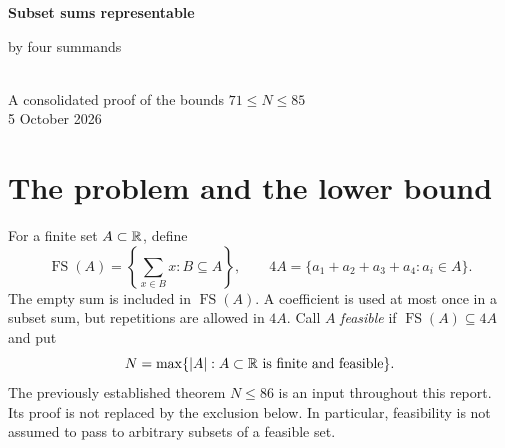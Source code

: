 \documentclass[11pt,letterpaper]{article}
\newcommand{\FS}{\operatorname{FS}}
\newcommand{\card}[1]{\lvert#1\rvert}
\theoremstyle{definition}\newtheorem{definition}[theorem]{Definition}
\begin{document}
\begin{center}
{\LARGE\bfseries Subset sums representable\par by four summands}\\[6pt]
{\large A consolidated proof of the bounds $71\le N\le85$}\\[5pt]
5 October 2026
\end{center}
\begin{abstract}
Let $N$ be the largest cardinality of a finite real set whose every subset sum is a sum of four of its elements, with repetition allowed in the four-term sum. We give an explicit $71$-element construction and organize the exclusion of cardinality $86$ into one coherent argument, obtaining $71\le N\le85$ from the previously established bound $N\le86$. The common covering budget, source estimates and loss-counting principles are stated once. The remaining cases are divided by their actual hole counts and their numbers of empty covering units. Each case is reduced to explicit endpoint, overlap or scalar contradictions. The prior upper bound, structural theorem and stated general and finite-backed additive-combinatorial results are retained inputs; this report does not claim a proof from first principles of those inputs. The companion program checks the explicitly identified finite assertions using exact arithmetic. The main text gives the common argument and its verification boundary; the longer complete stratum proofs are collected in labeled appendices. The exact value of $N$ remains unknown.
\end{abstract}
\setcounter{tocdepth}{2}{\setlength{\parskip}{0pt}\tableofcontents}
\clearpage
\section{The problem and the lower bound}\label{sec:problem}
For a finite set $A\subset\mathbb R$, define
\[
\FS(A)=\left\{\sum_{x\in B}x:B\subseteq A\right\},\qquad
4A=\{a_1+a_2+a_3+a_4:a_i\in A\}.
\]
The empty sum is included in $\FS(A)$. A coefficient is used at most once in a subset sum, but repetitions are allowed in $4A$. Call $A$ \emph{feasible} if $\FS(A)\subseteq4A$ and put
\[
N=\max\{\card A:A\subset\R\text{ is finite and feasible}\}.
\]
The previously established theorem $N\le86$ is an input throughout this report. Its proof is not replaced by the exclusion below. In particular, feasibility is not assumed to pass to arbitrary subsets of a feasible set.
\end{document}
